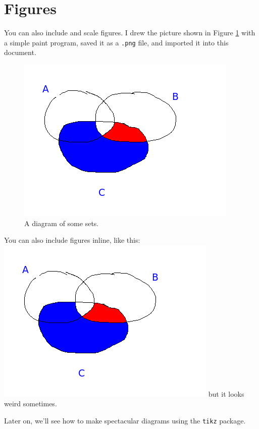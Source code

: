 \documentclass{article}
\begin{document}
\section{Figures}

You can also include and scale figures.
I drew the picture shown in Figure \ref{setfigure}
with a simple paint program, saved it as a {\tt .png}
file, and imported it into this document.


\begin{figure}
  \begin{center}
    \includegraphics[scale=0.5]{sets.png}
    \caption{A diagram of some sets.}
    \label{setfigure}
  \end{center}
\end{figure}

You can also include figures inline, like this:
\includegraphics[scale=0.25]{sets.png} but it looks weird sometimes.

Later on, we'll see how to make spectacular diagrams using the {\tt tikz}
package. 
\end{document}
